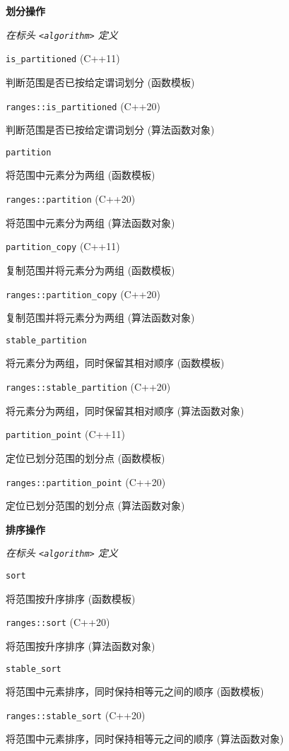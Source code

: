 \noindent \textbf{划分操作}

\textit{在标头 \lstinline{<algorithm>} 定义}


\noindent \lstinline{is_partitioned} (C++11)

判断范围是否已按给定谓词划分 (函数模板)

\noindent \lstinline{ranges::is_partitioned} (C++20)

判断范围是否已按给定谓词划分 (算法函数对象)

\noindent \lstinline{partition} 

将范围中元素分为两组 (函数模板)

\noindent \lstinline{ranges::partition} (C++20)

将范围中元素分为两组 (算法函数对象)

\noindent \lstinline{partition_copy} (C++11)

复制范围并将元素分为两组 (函数模板)

\noindent \lstinline{ranges::partition_copy} (C++20)

复制范围并将元素分为两组 (算法函数对象)

\noindent \lstinline{stable_partition}

将元素分为两组，同时保留其相对顺序 (函数模板)

\noindent \lstinline{ranges::stable_partition} (C++20)

将元素分为两组，同时保留其相对顺序 (算法函数对象)

\noindent \lstinline{partition_point} (C++11)

定位已划分范围的划分点 (函数模板)

\noindent \lstinline{ranges::partition_point} (C++20)

定位已划分范围的划分点 (算法函数对象)

\noindent \textbf{排序操作}

\textit{在标头 \lstinline{<algorithm>} 定义}


\noindent \lstinline{sort}

将范围按升序排序 (函数模板)

\noindent \lstinline{ranges::sort} (C++20)

将范围按升序排序 (算法函数对象)

\noindent \lstinline{stable_sort}

将范围中元素排序，同时保持相等元之间的顺序 (函数模板)

\noindent \lstinline{ranges::stable_sort} (C++20)

将范围中元素排序，同时保持相等元之间的顺序 (算法函数对象)

